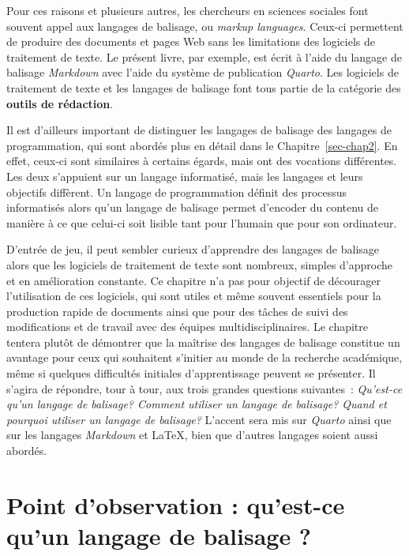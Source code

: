 \documentclass[
  letterpaper,
  DIV=11,
  numbers=noendperiod,
  oneside]{scrreprt}
\begin{document}
Pour ces raisons et plusieurs autres, les chercheurs en sciences
sociales font souvent appel aux langages de balisage, ou \emph{markup
languages}. Ceux-ci permettent de produire des documents et pages Web
sans les limitations des logiciels de traitement de texte. Le présent
livre, par exemple, est écrit à l'aide du langage de balisage
\emph{Markdown} avec l'aide du système de publication \emph{Quarto}. Les
logiciels de traitement de texte et les langages de balisage font tous
partie de la catégorie des \textbf{outils de rédaction}.

Il est d'ailleurs important de distinguer les langages de balisage des
langages de programmation, qui sont abordés plus en détail dans le
Chapitre~\ref{sec-chap2}. En effet, ceux-ci sont similaires à certains
égards, mais ont des vocations différentes. Les deux s'appuient sur un
langage informatisé, mais les langages et leurs objectifs diffèrent. Un
langage de programmation définit des processus informatisés alors qu'un
langage de balisage permet d'encoder du contenu de manière à ce que
celui-ci soit lisible tant pour l'humain que pour son ordinateur.

D'entrée de jeu, il peut sembler curieux d'apprendre des langages de
balisage alors que les logiciels de traitement de texte sont nombreux,
simples d'approche et en amélioration constante. Ce chapitre n'a pas
pour objectif de décourager l'utilisation de ces logiciels, qui sont
utiles et même souvent essentiels pour la production rapide de documents
ainsi que pour des tâches de suivi des modifications et de travail avec
des équipes multidisciplinaires. Le chapitre tentera plutôt de démontrer
que la maîtrise des langages de balisage constitue un avantage pour ceux
qui souhaitent s'initier au monde de la recherche académique, même si
quelques difficultés initiales d'apprentissage peuvent se présenter. Il
s'agira de répondre, tour à tour, aux trois grandes questions
suivantes~: \emph{Qu'est-ce qu'un langage de balisage? Comment utiliser
un langage de balisage? Quand et pourquoi utiliser un langage de
balisage?} L'accent sera mis sur \emph{Quarto} ainsi que sur les
langages \emph{Markdown} et \LaTeX{}, bien que d'autres langages soient
aussi abordés.

\hypertarget{point-dobservation-quest-ce-quun-langage-de-balisage}{%
\section{Point d'observation : qu'est-ce qu'un langage de balisage
?}\label{point-dobservation-quest-ce-quun-langage-de-balisage}}
\end{document}
